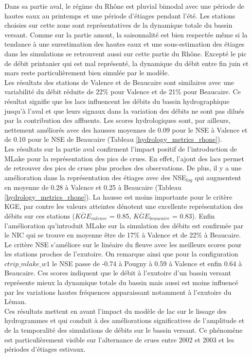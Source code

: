 Dans sa partie aval, le régime du Rhône est pluvial bimodal avec une période de hautes eaux au printemps et une période d'étiages pendant l'été. Les stations choisies sur cette zone sont représentatives de la dynamique totale du bassin versant. Comme sur la partie amont, la saisonnalité est bien respectée même si la tendance à une surestimation des hautes eaux et une sous-estimation des étiages dans les simulations se retrouvent aussi sur cette partie du Rhône. Excepté le pic de débit printanier qui est mal représenté, la dynamique du débit entre fin juin et mars reste particulièrement bien simulée par le modèle. \\
Les résultats des stations de Valence et de Beaucaire sont similaires avec une variabilité du débit réduite de 22\% pour Valence et de 21\% pour Beaucaire. Ce résultat signifie que les lacs influencent les débits du bassin hydrographique jusqu'à l'aval et que leurs signaux dans la variation des débits ne sont pas dilués par la contribution des affluents. Les scores hydrologiques sont, par ailleurs, nettement améliorés avec des hausses moyennes de 0.09 pour le NSE à Valence et de 0.10 pour le NSE de Beaucaire (Tableau \ref{hydrology_metrics_rhone}). \\
Les résultats sur la partie aval confirment l'impact positif de l'introduction de MLake pour la représentation des pics de crues. En effet, l'ajout des lacs permet de retrouver des pics de crues plus proches des observations. De plus, il y a une amélioration dans la représentation des étiages avec des NSE$_{log}$ qui augmentent en moyenne de 0.28 à Valence et 0.25 à Beaucaire (Tableau \ref{hydrology_metrics_rhone}). La hausse est moins importante pour le critère KGE, par contre les valeurs atteintes dénotent une excellente représentation des débits sur ces stations ($\overline{KGE}_{valence}$ = 0.85, $\overline{KGE}_{beaucaire}$ = 0.83). Enfin l'amélioration qu'introduit MLake sur la simulation des débits est confirmée par le NIC qui se trouve en moyenne être de 17\% à Valence et de 22\% à Beaucaire.\\

\noindent Le critère NSE s'améliore sur le linéaire du fleuve avec les meilleurs scores pour les stations proches de l'exutoire. On remarque ainsi que pour la configuration $ctrip\_mlake\_w1$ le NSE passe de -0.74 à Pougny à 0.59 à Valence et enfin 0.64 à Beaucaire. Ces scores indiquent que le débit à l'exutoire d'un bassin versant représente mieux la dynamique totale du bassin mais aussi est moins influencé par les variations hautes fréquences apparaissant notamment à l'exutoire du Léman.\\
Ces résultats mettent en avant l'impact du modèle de lac sur le lissage des hydrogrammes et qui conduit à des améliorations significatives de l'amplitude et de la temporalité des simulations de débits sur le bassin versant. Ce phénomène est particulièrement visible sur l'alternance de crues entre 2002 et 2003 et les périodes d'étiages estivaux. \\

